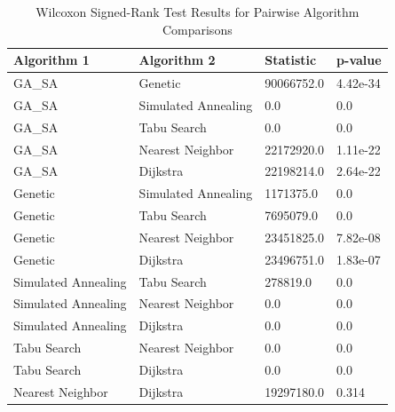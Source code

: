 \documentclass{article}
\begin{document}
    \begin{table}[h!]
        \centering
        \caption{Wilcoxon Signed-Rank Test Results for Pairwise Algorithm Comparisons}
        \label{tab:wilcoxon_results}
        \begin{tabularx}{\textwidth}{|l|l|X|X|}
            \hline
            \textbf{Algorithm 1} & \textbf{Algorithm 2} & \textbf{Statistic} & \textbf{p-value} \\
            \hline
            GA\_SA               & Genetic              & 90066752.0         & 4.42e-34         \\
            GA\_SA               & Simulated Annealing  & 0.0                & 0.0              \\
            GA\_SA               & Tabu Search          & 0.0                & 0.0              \\
            GA\_SA               & Nearest Neighbor     & 22172920.0         & 1.11e-22         \\
            GA\_SA               & Dijkstra             & 22198214.0         & 2.64e-22         \\
            Genetic              & Simulated Annealing  & 1171375.0          & 0.0              \\
            Genetic              & Tabu Search          & 7695079.0          & 0.0              \\
            Genetic              & Nearest Neighbor     & 23451825.0         & 7.82e-08         \\
            Genetic              & Dijkstra             & 23496751.0         & 1.83e-07         \\
            Simulated Annealing  & Tabu Search          & 278819.0           & 0.0              \\
            Simulated Annealing  & Nearest Neighbor     & 0.0                & 0.0              \\
            Simulated Annealing  & Dijkstra             & 0.0                & 0.0              \\
            Tabu Search          & Nearest Neighbor     & 0.0                & 0.0              \\
            Tabu Search          & Dijkstra             & 0.0                & 0.0              \\
            Nearest Neighbor     & Dijkstra             & 19297180.0         & 0.314            \\
            \hline
        \end{tabularx}
    \end{table}
    \newpage
\end{document}
